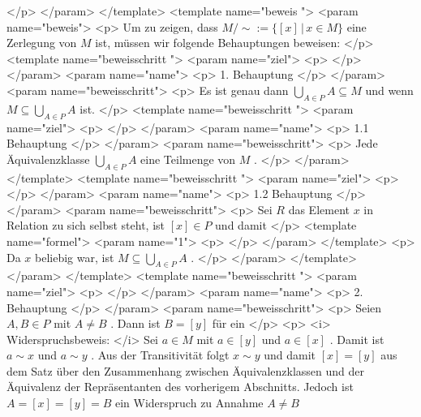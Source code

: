    </p>
   </param>
  </template>
  <template name="beweis
 ">
   <param name="beweis">
    <p>
     Um zu zeigen, dass
     ${M/{\sim}}:= \{ [x]\,|\,x\in M\}$
     eine Zerlegung von
     $M$
     ist, müssen wir folgende Behauptungen beweisen:
    </p>
    <template name="beweisschritt
 ">
     <param name="ziel">
      <p>
      </p>
     </param>
     <param name="name">
      <p>
       1. Behauptung
      </p>
     </param>
     <param name="beweisschritt">
      <p>
       Es ist genau dann
       $\bigcup_{A\in P} A \subseteq M$
       und wenn
       $M\subseteq \bigcup_{A\in P} A$
       ist.
      </p>
      <template name="beweisschritt
 ">
       <param name="ziel">
        <p>
        </p>
       </param>
       <param name="name">
        <p>
         1.1 Behauptung
        </p>
       </param>
       <param name="beweisschritt">
        <p>
         Jede Äquivalenzklasse
         $\bigcup_{A\in P} A$
         eine Teilmenge von
         $M$
         .
        </p>
       </param>
      </template>
      <template name="beweisschritt
 ">
       <param name="ziel">
        <p>
        </p>
       </param>
       <param name="name">
        <p>
         1.2 Behauptung
        </p>
       </param>
       <param name="beweisschritt">
        <p>
         Sei
         $R$
         das Element
         $x$
         in Relation zu sich selbst steht, ist
         $[x]\in P$
         und damit
        </p>
        <template name="formel">
         <param name="1">
          <p>
          </p>
         </param>
        </template>
        <p>
         Da
         $x$
         beliebig war, ist
         $M\subseteq \bigcup_{A\in P} A$
         .
        </p>
       </param>
      </template>
     </param>
    </template>
    <template name="beweisschritt
 ">
     <param name="ziel">
      <p>
      </p>
     </param>
     <param name="name">
      <p>
       2. Behauptung
      </p>
     </param>
     <param name="beweisschritt">
      <p>
       Seien
       $A,B\in P$
       mit
       $A\ne B$
       . Dann ist
       $B=[y]$
       für ein
      </p>
      <p>
       <i>
        Widerspruchsbeweis:
       </i>
       Sei
       $a\in M$
       mit
       $a\in [y]$
       und
       $a\in [x]$
       . Damit ist
       $a\sim x$
       und
       $a\sim y$
       . Aus der Transitivität folgt
       $x\sim y$
       und damit
       $[x]=[y]$
       aus dem Satz über den Zusammenhang zwischen Äquivalenzklassen und der Äquivalenz der Repräsentanten des vorherigem Abschnitts. Jedoch ist
       $A=[x]=[y]=B$
       ein Widerspruch zu Annahme
       $A\ne B$
